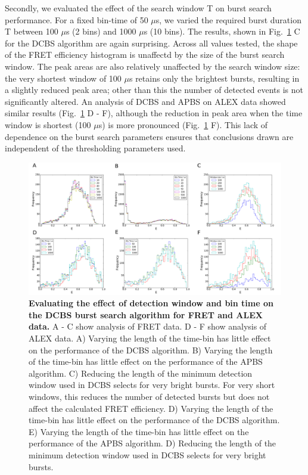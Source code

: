 Secondly, we evaluated the effect of the search window T on burst search performance. For a fixed bin-time of 50 $\mu$s, we varied the required burst duration T between 100 $\mu$s (2 bins) and 1000 $\mu$s (10 bins). The results, shown in Fig.~\ref{fig:fig7_binning} C for the DCBS algorithm are again surprising. Across all values tested, the shape of the FRET efficiency histogram is unaffectd by the size of the burst search window. The peak areas are also relatively unaffected by the search window size: the very shortest window of 100 $\mu$s retains only the brightest bursts, resulting in a slightly reduced peak area; other than this the number of detected events is not significantly altered. An analysis of DCBS and APBS on ALEX data showed similar results (Fig.~\ref{fig:fig7_binning} D - F), although the reduction in peak area when the time window is shortest (100 $\mu$s) is more pronounced (Fig.~\ref{fig:fig7_binning} F). This lack of dependence on the burst search parameters ensures that conclusions drawn are independent of the thresholding parameters used.

\begin{figure}[!ht]
   \begin{center}
      \includegraphics*[clip=true, width=6in]{pyFRET/window_effect.pdf}
      \caption{{\bf Evaluating the effect of detection window and bin time on the DCBS burst search algorithm for FRET and ALEX data.} A - C show analysis of FRET data. D - F show analysis of ALEX data. A) Varying the length of the time-bin has little effect on the performance of the DCBS algorithm. B) Varying the length of the time-bin has little effect on the performance of the APBS algorithm. C) Reducing the length of the minimum detection window used in DCBS selects for very bright bursts. For very short windows, this reduces the number of detected bursts but does not affect the calculated FRET efficiency. D) Varying the length of the time-bin has little effect on the performance of the DCBS algorithm. E) Varying the length of the time-bin has little effect on the performance of the APBS algorithm. D) Reducing the length of the minimum detection window used in DCBS selects for very bright bursts.}
      \label{fig:fig7_binning}
   \end{center}
\end{figure}

